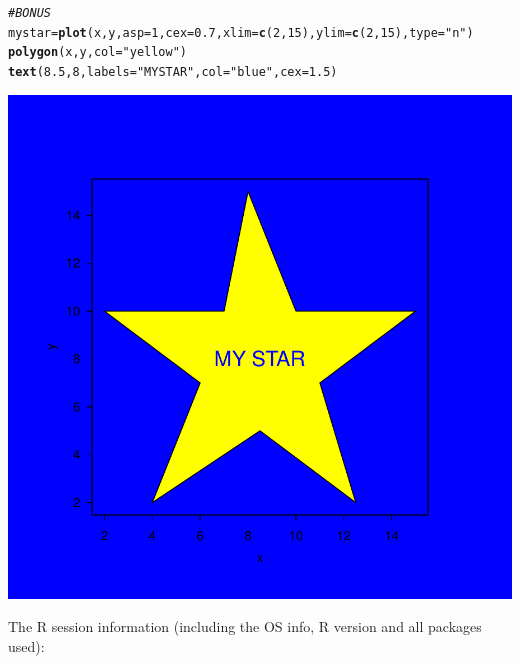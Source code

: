 \documentclass{article}\usepackage[]{graphicx}\usepackage[]{xcolor}
\makeatletter
\newcommand{\hlnum}[1]{\textcolor[rgb]{0.686,0.059,0.569}{#1}}%
\newcommand{\hlstr}[1]{\textcolor[rgb]{0.192,0.494,0.8}{#1}}%
\newcommand{\hlcom}[1]{\textcolor[rgb]{0.678,0.584,0.686}{\textit{#1}}}%
\newcommand{\hlstd}[1]{\textcolor[rgb]{0.345,0.345,0.345}{#1}}%
\newcommand{\hlkwb}[1]{\textcolor[rgb]{0.69,0.353,0.396}{#1}}%
\newcommand{\hlkwc}[1]{\textcolor[rgb]{0.333,0.667,0.333}{#1}}%
\newcommand{\hlkwd}[1]{\textcolor[rgb]{0.737,0.353,0.396}{\textbf{#1}}}%
\newenvironment{kframe}{%
 \def\at@end@of@kframe{}%
 \ifinner\ifhmode%
  \def\at@end@of@kframe{\end{minipage}}%
  \begin{minipage}{\columnwidth}%
 \fi\fi%
 \def\FrameCommand##1{\hskip\@totalleftmargin \hskip-\fboxsep
 \colorbox{shadecolor}{##1}\hskip-\fboxsep
     \hskip-\linewidth \hskip-\@totalleftmargin \hskip\columnwidth}%
 \MakeFramed {\advance\hsize-\width
   \@totalleftmargin\z@ \linewidth\hsize
   \@setminipage}}%
 {\par\unskip\endMakeFramed%
 \at@end@of@kframe}
\newenvironment{knitrout}{}{} %
\makeatother
\begin{document}
\begin{knitrout}
{}


\begin{kframe}\begin{alltt}
\hlcom{#BONUS}
\hlstd{mystar} \hlkwb{=} \hlkwd{plot}\hlstd{(x,y,} \hlkwc{asp} \hlstd{=} \hlnum{1}\hlstd{,} \hlkwc{cex} \hlstd{=} \hlnum{0.7}\hlstd{,} \hlkwc{xlim} \hlstd{=}\hlkwd{c}\hlstd{(}\hlnum{2}\hlstd{,}\hlnum{15}\hlstd{),} \hlkwc{ylim} \hlstd{=} \hlkwd{c}\hlstd{(}\hlnum{2}\hlstd{,}\hlnum{15}\hlstd{),} \hlkwc{type}\hlstd{=}\hlstr{"n"}\hlstd{)}
\hlkwd{polygon}\hlstd{(x,y,}\hlkwc{col}\hlstd{=}\hlstr{"yellow"}\hlstd{)}
\hlkwd{text}\hlstd{(}\hlnum{8.5}\hlstd{,}\hlnum{8}\hlstd{,}\hlkwc{labels} \hlstd{=} \hlstr{"MY STAR"}\hlstd{,} \hlkwc{col}\hlstd{=} \hlstr{"blue"}\hlstd{,} \hlkwc{cex} \hlstd{=} \hlnum{1.5}\hlstd{)}
\end{alltt}
\end{kframe}

{\centering \includegraphics[width=.6\linewidth]{figure/Meng51940633A3-Rnwauto-report-8} 

}


\end{knitrout}

The R session information (including the OS info, R version and all
packages used):
\end{document}
